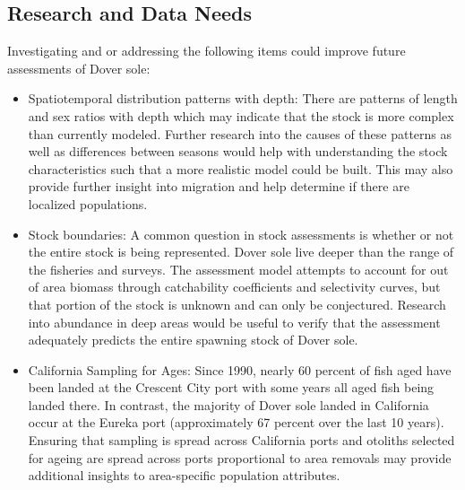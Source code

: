 \documentclass[11pt,
  english,
  a4paper,
]{article}
\begin{document}
\endgroup{}


\hypertarget{research-and-data-needs}{%
\subsection*{Research and Data Needs}\label{research-and-data-needs}}

\leavevmode\tagmcend\tagstructend


Investigating and or addressing the following items could improve future assessments of Dover sole:

\leavevmode\tagmcend\tagstructend\par

\begin{itemize}

\item Spatiotemporal distribution patterns with depth:  There are patterns of length and sex ratios with depth which may indicate that the stock is more complex than currently modeled.  Further research into the causes of these patterns as well as differences between seasons would help with understanding the stock characteristics such that a more realistic model could be built.  This may also provide further insight into migration and help determine if there are localized populations.

\item Stock boundaries: A common question in stock assessments is whether or not the entire stock is being represented. Dover sole live deeper than the range of the fisheries and surveys.  The assessment model attempts to account for out of area biomass through catchability coefficients and selectivity curves, but that portion of the stock is unknown and can only be conjectured.  Research into abundance in deep areas would be useful to verify that the assessment adequately predicts the entire spawning stock of Dover sole.

\item California Sampling for Ages: Since 1990, nearly 60 percent of fish aged have been landed at the Crescent City port with some years all aged fish being landed there. In contrast, the majority of Dover sole landed in California occur at the Eureka port (approximately 67 percent over the last 10 years). Ensuring that sampling is spread across California ports and otoliths selected for ageing are spread across ports proportional to area removals may provide additional insights to area-specific population attributes.

\end{itemize}
\end{document}
